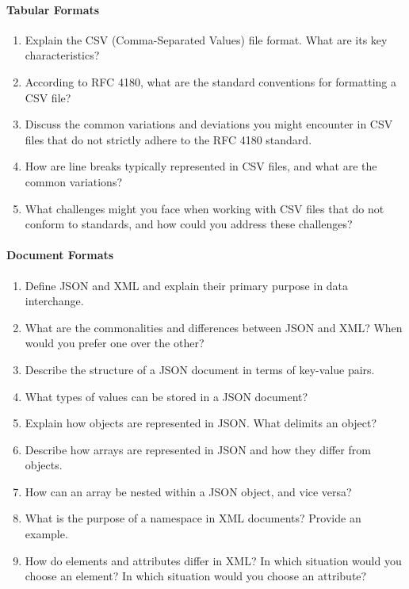 \paragraph*{Tabular Formats}
\begin{enumerate}
    \item Explain the CSV (Comma-Separated Values) file format. What are its key characteristics?
    \item According to RFC 4180, what are the standard conventions for formatting a CSV file?
    \item Discuss the common variations and deviations you might encounter in CSV files that do not strictly adhere to the RFC 4180 standard.
    \item How are line breaks typically represented in CSV files, and what are the common variations?
    \item What challenges might you face when working with CSV files that do not conform to standards, and how could you address these challenges?
\end{enumerate}
\paragraph*{Document Formats}
\begin{enumerate}
    \item Define JSON and XML and explain their primary purpose in data interchange.
    \item What are the commonalities and differences between JSON and XML? When would you prefer one over the other?
    \item Describe the structure of a JSON document in terms of key-value pairs.
    \item What types of values can be stored in a JSON document?
    \item Explain how objects are represented in JSON. What delimits an object?
    \item Describe how arrays are represented in JSON and how they differ from objects.
    \item How can an array be nested within a JSON object, and vice versa?
    \item What is the purpose of a namespace in XML documents? Provide an example.
    \item How do elements and attributes differ in XML? In which situation would you choose an element? In which situation would you choose an attribute?
\end{enumerate}
